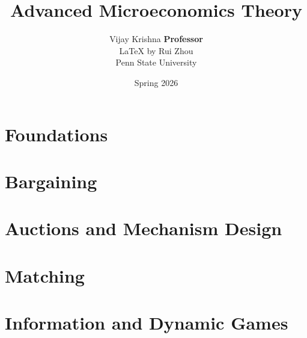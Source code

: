\documentclass[oneside]{book}
\def\notetitle{Advanced Microeconomics Theory}
\def\noteauthor{Vijay Krishna
    \textbf{Professor} \\ 
    {\LaTeX} by Rui Zhou\\
    Penn State University}
\def\notedate{Spring 2026}
\begin{document}
\title{\textbf{
    \LARGE{\notetitle} \vspace*{10\baselineskip}}
    }
\author{\noteauthor}
\date{\notedate}

\maketitle
\newpage

\setcounter{tocdepth}{1}
\tableofcontents
\newpage

\frontmatter


\mainmatter
\part{Foundations}



\part{Bargaining}


\part{Auctions and Mechanism Design}



\part{Matching}


\part{Information and Dynamic Games}



\end{document}
